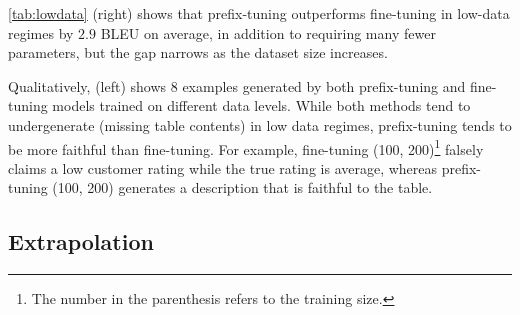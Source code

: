 \documentclass[11pt,a4paper]{article}
\newcommand\pl[1]{\textcolor{red}{[PL: #1]}}
\newcommand\lisa[1]{\textcolor{blue}{[Lisa: #1]}}
\begin{document}
\cref{tab:lowdata} (right) shows that prefix-tuning outperforms fine-tuning in low-data regimes by $2.9$ BLEU on average,
in addition to requiring many fewer parameters, but the gap narrows as the dataset size increases. 

Qualitatively,  (left) shows $8$ examples generated by both prefix-tuning and fine-tuning models trained on different data levels. While both methods tend to undergenerate (missing table contents) in low data regimes, prefix-tuning tends to be more faithful than fine-tuning.  For example, fine-tuning (100, 200)\footnote{The number in the parenthesis refers to the training size.} falsely claims a low customer rating while the true rating is average, whereas prefix-tuning (100, 200) generates a description that is faithful to the table. 

\subsection{Extrapolation}
\label{sec:extrapolation}
\end{document}
